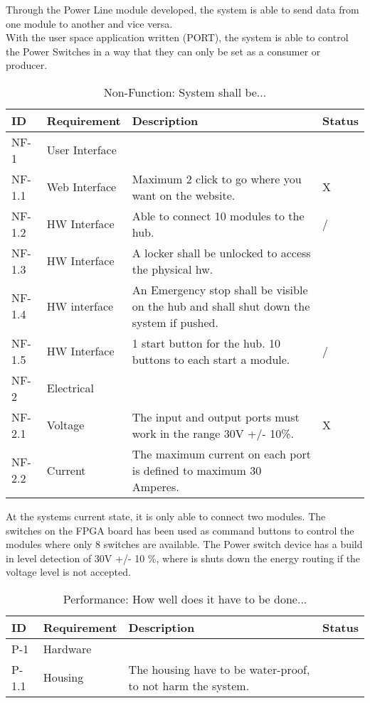 Through the Power Line module developed, the system is able to send data from one module to another and vice versa. 
\\With the user space application written (PORT), the system is able to control the Power Switches in a way that they can only be set as a consumer or producer.
\begin{table}[H]
	\begin{tabular} [b] {| p{1.1cm} |  p{2.5cm} | p{11.0cm} | p{1.0cm} |}
	\hline
	\textbf{ID} & \textbf{Requirement} & \textbf{Description} & Status\\\hline
		NF-1 & User Interface 	& ~  & ~ \\ \hline
		NF-1.1 & Web Interface 	& Maximum 2 click to go where you want on the website. & X \\ \hline
		NF-1.2 & HW Interface	& Able to connect 10 modules to the hub. & / \\ \hline
		NF-1.3 & HW Interface	& A locker shall be unlocked to access the physical hw. & ~ \\ \hline
		NF-1.4 & HW interface	& An Emergency stop shall be visible on the hub and shall shut down the system if pushed. & ~ \\ \hline
		NF-1.5 & HW Interface	& 1 start button for the hub. 10 buttons to each start a module. & / \\ \hline
		NF-2 & Electrical 		& ~ & ~ \\ \hline
		NF-2.1 & Voltage 		& The input and output ports must work in the range 30V +/-  10\%. & X \\ \hline
		NF-2.2 & Current 		& The maximum current on each port is defined to maximum 30 Amperes. & ~ \\ \hline
	\end{tabular}
	\caption{Non-Function: System shall be...}
\end{table}
At the systems current state, it is only able to connect two modules. The switches on the FPGA board has been used as command buttons to control the modules where only 8 switches are available. The Power switch device has a build in level detection of 30V +/- 10 \%, where is shuts down the energy routing if the voltage level is not accepted.
\begin{table}[H]
	\begin{tabular} [b] {| p{1.1cm} |  p{2.5cm} | p{11.0cm} | p{1.0cm} |}
	\hline
	\textbf{ID} & \textbf{Requirement} & \textbf{Description} & Status\\\hline
		P-1 & Hardware 		&  ~ & ~ \\ \hline
		P-1.1 & Housing 		& The housing have to be water-proof, to not harm the system. & ~ \\ \hline
	\end{tabular}
	\caption{Performance: How well does it have to be done...}
\end{table}
